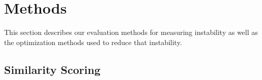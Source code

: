 \documentclass[10pt,conference]{IEEEtran}
\makeatletter
\newcommand{\mybox}[1]{%
  \setbox0=\hbox{#1}%
  \setlength{\@tempdima}{\dimexpr\linewidth}%
  \begin{tcolorbox}[colframe=mycolor,boxrule=0.5pt,arc=4pt,
      left=6pt,right=6pt,top=6pt,bottom=6pt,boxsep=0pt,width=\@tempdima]
    #1
  \end{tcolorbox}
}
\theoremstyle{break}
\makeatother
\begin{document}





\section{Methods}
\label{sect:evaluation}
This section describes our evaluation methods for measuring instability as well as the optimization
methods used to reduce that instability.

\subsection{Similarity Scoring}
\end{document}
